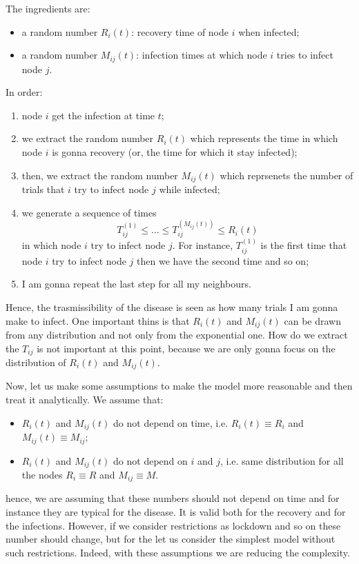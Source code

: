 \documentclass[../main/main.tex]{subfiles}
\begin{document}
The ingredients are:
\begin{itemize}
\item a random number \( R_i (t) \): recovery time of node \( i \) when infected;
\item a random number \( M_{ij} (t) \): infection times at which node \( i \) tries to infect node \( j \).
\end{itemize}
In order:
\begin{enumerate}
\item node \( i \) get the infection at time \( t \);
\item we extract the random number \( R_i (t) \) which represents the time in which node \( i \) is gonna recovery (or, the time for which it stay infected);
\item then, we extract the random number  \( M_{ij} (t) \) which reprsenets the number of trials that \( i \) try to infect node \( j \) while infected;
\item we generate a sequence of times
\begin{equation*}
  T_{ij}^{(1)} \le \dots \le T_{ij}^{(M_{ij}(t))} \le R_i (t)
\end{equation*}
in which node \( i \) try to infect node \( j \). For instance, \(  T_{ij}^{(1)} \) is the first time that node \( i \) try to infect node \( j \) then we have the second time and so on;
\item I am gonna repeat the last step for all my neighbours.
\end{enumerate}
Hence, the trasmissibility of the disease is seen as how many trials I am gonna make to infect.
One important thins is that \( R_i (t) \) and \( M_{ij} (t) \) can be drawn from any distribution and not only from the exponential one.
How do we extract the \( T_{ij} \) is not important at this point, because we are only gonna focus on the distribution of \( R_i (t) \) and \( M_{ij} (t) \).


Now, let us make some assumptions to make the model more reasonable and then treat it analytically. We assume that:
\begin{itemize}
\item \( R_i (t) \) and \( M_{ij} (t) \) do not depend on time, i.e. \( R_i (t) \equiv R_i \) and \( M_{ij} (t)  \equiv M_{ij} \);
\item \( R_i (t) \) and \( M_{ij} (t) \)  do not depend on \( i \) and \( j \), i.e. same distribution for all the nodes \( R_i \equiv R \) and \( M_{ij} \equiv M \).
\end{itemize}
hence, we are assuming that these numbers should not depend on time and for instance they are typical for the disease. It is valid both for the recovery and for the infections. However, if we consider restrictions as lockdown and so on these number should change, but for the let us consider the simplest model without such restrictions. Indeed, with these assumptions we are reducing the complexity.
\end{document}
